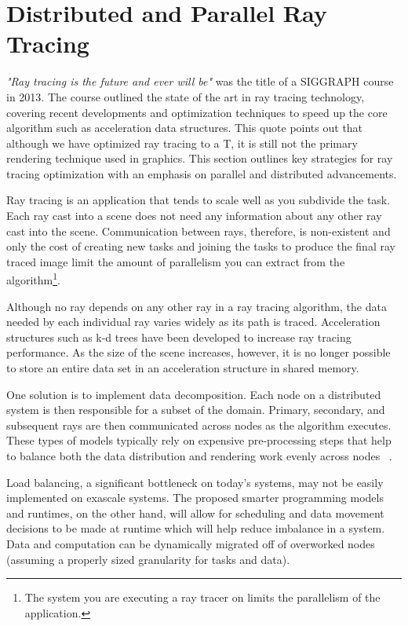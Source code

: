 \section{Distributed and Parallel Ray Tracing}
\label{sec:ray_tracing}

\emph{"Ray tracing is the future and ever will be"} was the title of a SIGGRAPH 
course in 2013.  The course outlined the state of the art in ray tracing 
technology, covering recent developments and optimization techniques to speed up 
the core algorithm such as acceleration data structures.  This quote points out 
that although we have optimized ray tracing to a T, it is still not the primary
rendering technique used in graphics.  This section outlines key strategies for 
ray tracing optimization with an emphasis on parallel and distributed 
advancements.

Ray tracing is an application that tends to scale well as you subdivide the 
task.  Each ray cast into a scene does not need any information about any other 
ray cast into the scene.  Communication between rays, therefore, is non-existent 
and only the cost of creating new tasks and joining the tasks to produce the 
final ray traced image limit the amount of parallelism you can extract from the
algorithm\footnote{ %
  The system you are executing a ray tracer on limits the parallelism of the 
  application.  
}.

Although no ray depends on any other ray in a ray tracing algorithm, the data 
needed by each individual ray varies widely as its path is traced. Acceleration 
structures such as k-d trees have been developed to increase ray tracing 
performance. As the size of the scene increases, however, it is no longer 
possible to store an entire data set in an acceleration structure in shared 
memory.

One solution is to implement data decomposition. Each node on a distributed 
system is then responsible for a subset of the domain. Primary, secondary, 
and subsequent rays are then communicated across nodes as the algorithm 
executes. These types of models typically rely on expensive pre-processing steps 
that help to balance both the data distribution and rendering work evenly across 
nodes ~\cite{navratil2014dynamic}.

Load balancing, a significant bottleneck on today's systems, may not be easily 
implemented on exascale systems. The proposed smarter programming models and 
runtimes, on the other hand, will allow for scheduling and data movement 
decisions to be made at runtime which will help reduce imbalance in a system. 
Data and computation can be dynamically migrated off of overworked nodes 
(assuming a properly sized granularity for tasks and data).


